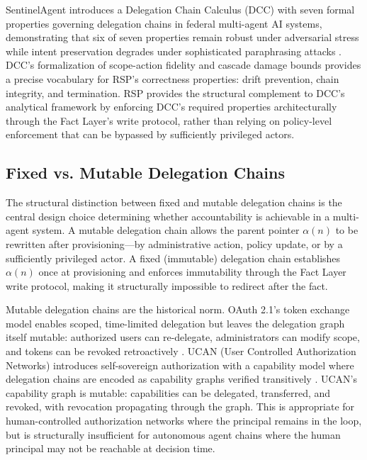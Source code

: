 SentinelAgent introduces a Delegation Chain Calculus (DCC) with seven formal properties governing delegation chains in federal multi-agent AI systems, demonstrating that six of seven properties remain robust under adversarial stress while intent preservation degrades under sophisticated paraphrasing attacks \cite{sentinelagent2026}. DCC's formalization of scope-action fidelity and cascade damage bounds provides a precise vocabulary for RSP's correctness properties: drift prevention, chain integrity, and termination. RSP provides the structural complement to DCC's analytical framework by enforcing DCC's required properties architecturally through the Fact Layer's write protocol, rather than relying on policy-level enforcement that can be bypassed by sufficiently privileged actors.

\subsection{Fixed vs. Mutable Delegation Chains}

The structural distinction between fixed and mutable delegation chains is the central design choice determining whether accountability is achievable in a multi-agent system. A mutable delegation chain allows the parent pointer $\alpha(n)$ to be rewritten after provisioning---by administrative action, policy update, or by a sufficiently privileged actor. A fixed (immutable) delegation chain establishes $\alpha(n)$ once at provisioning and enforces immutability through the Fact Layer write protocol, making it structurally impossible to redirect after the fact.

Mutable delegation chains are the historical norm. OAuth 2.1's token exchange model enables scoped, time-limited delegation but leaves the delegation graph itself mutable: authorized users can re-delegate, administrators can modify scope, and tokens can be revoked retroactively \cite{UCAN}. UCAN (User Controlled Authorization Networks) introduces self-sovereign authorization with a capability model where delegation chains are encoded as capability graphs verified transitively \cite{UCAN}. UCAN's capability graph is mutable: capabilities can be delegated, transferred, and revoked, with revocation propagating through the graph. This is appropriate for human-controlled authorization networks where the principal remains in the loop, but is structurally insufficient for autonomous agent chains where the human principal may not be reachable at decision time.

